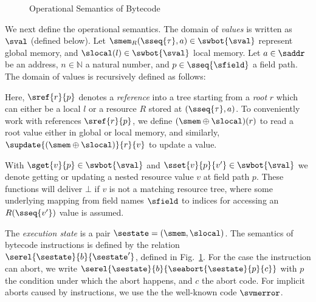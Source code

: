 \begin{figure}[t!]
  \caption{Operational Semantics of Bytecode}
  \label{fig:Semantics}
\end{figure}



We next define the operational semantics. The domain of \emph{values} is written
as $\sval$ (defined below).  Let $\smem_R(\sseq{\tau}, a) \in \swbot{\sval}$
represent global memory, and $\slocal(l) \in \swbot{\sval}$ local
memory. Let $a \in \saddr$ be an address, $n \in \mathbb{N}$ a natural number,
and $p \in \sseq{\sfield}$ a field path.  The domain of values is recursively
defined as follows:
Here, $\sref{r}{p}$ denotes a \emph{reference} into a tree starting from a
\emph{root} $r$ which can either be a local $l$ or a resource $R$ stored at
$(\sseq{\tau},a)$. To conveniently work with references $\sref{r}{p}$, we define
$(\smem \oplus \slocal)(r)$ to read a root value either in global or local
memory, and similarly, $\supdate{(\smem \oplus \slocal)}{r}{v}$ to update a
value.

With $\sget{v}{p} \in \swbot{\sval}$ and $\sset{v}{p}{v'} \in \swbot{\sval}$ we
denote getting or updating a nested resource value $v$ at field path $p$. These
functions will deliver $\bot$ if $v$ is not a matching resource tree, where some
underlying mapping from field names $\sfield$ to indices for accessing an
$R(\sseq{v'})$ value is assumed.

The \emph{execution state} is a pair $\sestate = (\smem, \slocal)$. The
semantics of bytecode instructions is defined by the relation
$\serel{\sestate}{b}{\sestate'}$, defined in Fig.~\ref{fig:Semantics}. For the
case the instruction can abort, we write
$\serel{\sestate}{b}{\seabort{\sestate}{p}{c}}$ with $p$ the condition under
which the abort happens, and $c$ the abort code. For implicit aborts caused by
instructions, we use the the well-known code $\svmerror$.

